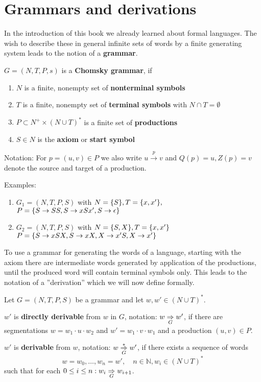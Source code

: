 \section{Grammars and derivations}

In the introduction of this book we already learned about formal languages. The
wish to describe these in general infinite sets of words by a finite generating
system leads to the notion of a {\bf grammar}.

\begin{definition}
$G = (N, T, P, s)$ is a {\bf Chomsky grammar}, if
\begin{enumerate}
  \item $N$ is a finite, nonempty set of {\bf nonterminal symbols}
  \item $T$ is a finite, nonempty set of {\bf terminal symbols} with
  $N \cap T = \emptyset$
  \item $P \subset N^+ \times (N \cup T)^*$ is a finite set of {\bf productions}
  \item $S \in N$ is the {\bf axiom} or {\bf start symbol} 
\end{enumerate}
\end{definition}

Notation: For $p = (u, v) \in P$ we also write $u \stackrel{p}{\to} v$ and
$Q(p) = u, Z(p) = v$ denote the source and target of a production.

Examples:
\begin{enumerate}
  \item $G_1 = (N, T, P, S)$ with $N = \mbox{$\{S\}$}, T = \mbox{$\{x, x'\}$},$ \\ 
  $P = \mbox{$\{S \to SS, S \to xSx', S \to \epsilon\}$}$
  \item $G_2 = (N, T, P, S)$ with $N = \mbox{$\{S, X\}$}, T = \mbox{$\{x, x'\}$}$ \\
  $P = \mbox{$\{S \to xSX, S \to xX, X \to x'S, X \to x'\}$}$
\end{enumerate}

To use a grammar for generating the words of a language, starting with the axiom
there are intermediate words generated by application of the productions, until
the produced word will contain terminal symbols only. This leads to the notation
of a ''derivation'' which we will now define formally.

\begin{definition}
Let $G = (N, T, P, S)$ be a grammar and let $w, w' \in (N \cup T)^*$.

$w'$ is {\bf directly derivable} from $w$ in $G$, notation: $w
\underset{G}{\Rightarrow} w'$, if there are segmentations $w = w_1 \cdot u \cdot w_2$ and
$w' = w_1 \cdot v \cdot w_1$ and a production $(u, v) \in P$.

$w'$ is {\bf derivable} from $w$, notation: $w \underset{G}{\overset{*}{\Rightarrow}} w'$, if there exists
a sequence of words \[ w = w_0, \ldots, w_n = w',\quad n \in \mathbb{N}, w_i \in
(N \cup T)^* \] such that for each $0 \leq i \leq n : w_i \underset{G}{\Rightarrow}
w_{i+1}$.
\end{definition}

